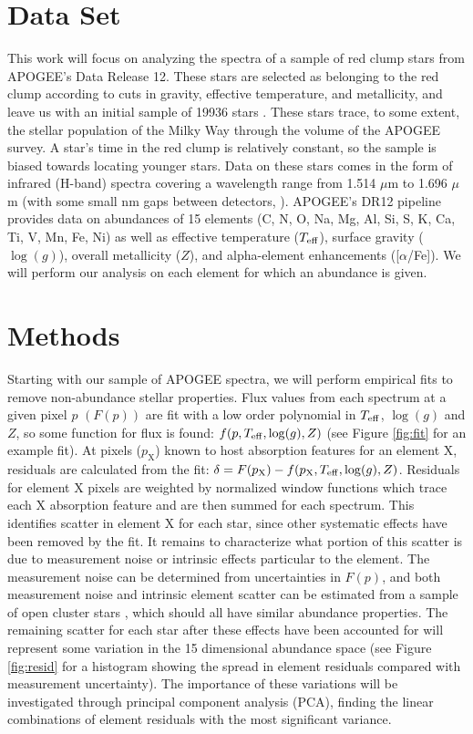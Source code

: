 \documentclass[preprint]{aastex}
\begin{document}
\section{Data Set}
\label{sec:data}
This work will focus on analyzing the spectra of a sample of red clump stars from APOGEE's Data Release 12. These stars are selected as belonging to the red clump according to cuts in gravity, effective temperature, and metallicity, and leave us with an initial sample of 19936 stars \citep{bovy2014}. These stars trace, to some extent, the stellar population of the Milky Way through the volume of the APOGEE survey. A star's time in the red clump is relatively constant, so the sample is biased towards locating younger stars. Data on these stars comes in the form of infrared (H-band) spectra covering a wavelength range from 1.514 $\mu$m to 1.696 $\mu$m (with some small nm gaps between detectors, \citealt{APOGEE}). APOGEE's DR12 pipeline provides data on abundances of 15 elements (C, N, O, Na, Mg, Al, Si, S, K, Ca, Ti, V, Mn, Fe, Ni) as well as effective temperature ($T_{\rm eff}$), surface gravity ($\log(g)$), overall metallicity ($Z$), and alpha-element enhancements ([$\alpha$/Fe])\citep{holtzman2015}. We will perform our analysis on each element for which an abundance is given.

\section{Methods}
\label{sec:methods}
Starting with our sample of APOGEE spectra, we will perform empirical fits to remove non-abundance stellar properties. Flux values from each spectrum at a given pixel $p$ $(F(p))$ are fit with a low order polynomial in $T_{\rm eff}$, $\log(g)$ and $Z$, so some function for flux is found: $f(p,T_{\rm eff},\log(g),Z)$ (see Figure \ref{fig:fit} for an example fit). At pixels ($p_\mathrm{X}$) known to host absorption features for an element X, residuals are calculated from the fit: $\delta = F(p_\mathrm{X}) - f(p_\mathrm{X},T_{\rm eff},\log(g),Z)$. Residuals for element X pixels are weighted by normalized window functions which trace each X absorption feature and are then summed for each spectrum. This identifies scatter in element X for each star, since other systematic effects have been removed by the fit. It remains to characterize what portion of this scatter is due to measurement noise or intrinsic effects particular to the element. The measurement noise can be determined from uncertainties in $F(p)$, and both measurement noise and intrinsic element scatter can be estimated from a sample of open cluster stars \citep{meszaros2015}, which should all have similar abundance properties. The remaining scatter for each star after these effects have been accounted for will represent some variation in the 15 dimensional abundance space (see Figure \ref{fig:resid} for a histogram showing the spread in element residuals compared with measurement uncertainty). The importance of these variations will be investigated through principal component analysis (PCA), finding the linear combinations of element residuals with the most significant variance.
\end{document}
